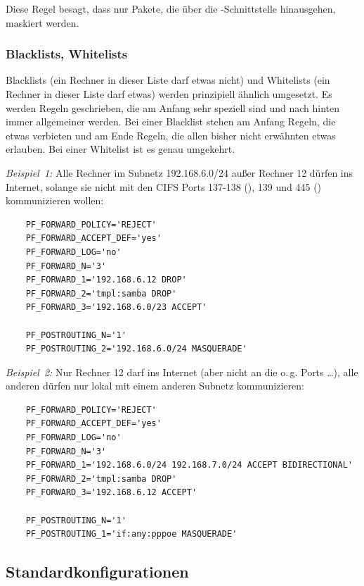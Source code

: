 Diese Regel besagt, dass nur Pakete, die über die -Schnittstelle
hinausgehen, maskiert werden.

\subsubsection{Blacklists, Whitelists}

Blacklists (ein Rechner in dieser Liste darf etwas nicht) und
Whitelists (ein Rechner in dieser Liste darf etwas) werden prinzipiell
ähnlich umgesetzt. Es werden Regeln geschrieben, die am Anfang sehr
speziell sind und nach hinten immer allgemeiner werden. Bei einer
Blacklist stehen am Anfang Regeln, die etwas verbieten und am Ende
Regeln, die allen bisher nicht erwähnten etwas erlauben. Bei einer
Whitelist ist es genau umgekehrt.

\emph{Beispiel~1:} Alle Rechner im Subnetz 192.168.6.0/24 außer Rechner 12
dürfen ins Internet, solange sie nicht mit den CIFS Ports 137-138
(), 139 und 445 () kommunizieren wollen:

\begin{example}
\begin{verbatim}
    PF_FORWARD_POLICY='REJECT'
    PF_FORWARD_ACCEPT_DEF='yes'
    PF_FORWARD_LOG='no'
    PF_FORWARD_N='3'
    PF_FORWARD_1='192.168.6.12 DROP'
    PF_FORWARD_2='tmpl:samba DROP'
    PF_FORWARD_3='192.168.6.0/23 ACCEPT'

    PF_POSTROUTING_N='1'
    PF_POSTROUTING_2='192.168.6.0/24 MASQUERADE'
\end{verbatim}
\end{example}

\emph{Beispiel~2:} Nur Rechner 12 darf ins Internet (aber nicht an die o.\,g.
Ports \ldots), alle anderen dürfen nur lokal mit einem anderen Subnetz
kommunizieren:

\begin{example}
\begin{verbatim}
    PF_FORWARD_POLICY='REJECT'
    PF_FORWARD_ACCEPT_DEF='yes'
    PF_FORWARD_LOG='no'
    PF_FORWARD_N='3'
    PF_FORWARD_1='192.168.6.0/24 192.168.7.0/24 ACCEPT BIDIRECTIONAL'
    PF_FORWARD_2='tmpl:samba DROP'
    PF_FORWARD_3='192.168.6.12 ACCEPT'

    PF_POSTROUTING_N='1'
    PF_POSTROUTING_1='if:any:pppoe MASQUERADE'
\end{verbatim}
\end{example}

\subsection{Standardkonfigurationen}

